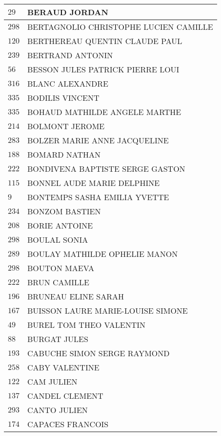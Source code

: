 \begin{xltabular}{\linewidth}{|l|X|}
    \hline
    $29$ & BERAUD JORDAN \\
    \hline
    $298$ & BERTAGNOLIO CHRISTOPHE LUCIEN CAMILLE \\
    \hline
    $120$ & BERTHEREAU QUENTIN CLAUDE PAUL \\
    \hline
    $239$ & BERTRAND ANTONIN \\
    \hline
    $56$ & BESSON JULES PATRICK PIERRE LOUI \\
    \hline
    $316$ & BLANC ALEXANDRE \\
    \hline
    $335$ & BODILIS VINCENT	 \\
    \hline
    $335$ & BOHAUD MATHILDE ANGELE MARTHE \\
    \hline
    $214$ & BOLMONT JEROME \\
    \hline
    $283$ & BOLZER MARIE ANNE JACQUELINE \\
    \hline
    $188$ & BOMARD NATHAN \\
    \hline
    $222$ & BONDIVENA BAPTISTE SERGE GASTON \\
    \hline
    $115$ & BONNEL AUDE MARIE DELPHINE \\
    \hline
    $9$ & BONTEMPS SASHA EMILIA YVETTE \\
    \hline
    $234$ & BONZOM BASTIEN \\
    \hline
    $208$ & BORIE ANTOINE \\
    \hline
    $298$ & BOULAL SONIA \\
    \hline
    $289$ & BOULAY MATHILDE OPHELIE MANON \\
    \hline
    $298$ & BOUTON MAEVA \\
    \hline
    $222$ & BRUN CAMILLE \\
    \hline
    $196$ & BRUNEAU ELINE SARAH \\
    \hline
    $167$ & BUISSON LAURE MARIE-LOUISE SIMONE \\
    \hline
    $49$ & BUREL TOM THEO VALENTIN \\
    \hline
    $88$ & BURGAT JULES \\
    \hline
    $193$ & CABUCHE SIMON SERGE RAYMOND \\
    \hline
    $258$ & CABY VALENTINE \\
    \hline
    $122$ & CAM JULIEN \\
    \hline
    $137$ & CANDEL CLEMENT \\
    \hline
    $293$ & CANTO JULIEN \\
    \hline
    $174$ & CAPACES FRANCOIS \\

\end{xltabular}
